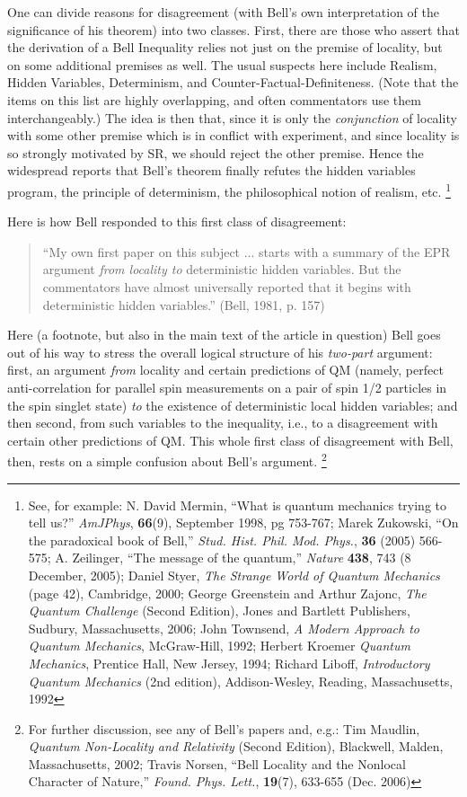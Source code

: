 \documentclass[aps,prc,twocolumn]{revtex4}
\begin{document}
One can divide reasons for disagreement (with Bell's own interpretation
of the significance of his theorem) into two classes.  First, there are
those who assert that the derivation of a Bell Inequality relies not
just on the premise of locality, but on some additional premises
as well.  The usual suspects here include Realism, Hidden Variables,
Determinism, and Counter-Factual-Definiteness.  (Note that the items
on this list are highly overlapping, and often commentators use them
interchangeably.)  The idea is then that, since it is only the
\emph{conjunction} of locality with some other premise which is in conflict
with experiment, and since locality is so strongly motivated by SR, we
should reject the other premise.  Hence the widespread reports that
Bell's theorem finally refutes the hidden variables program, the
principle of determinism, the philosophical notion of realism, etc.
\footnote{See, for example:  N. David Mermin, ``What is quantum
  mechanics trying to tell us?'' \emph{AmJPhys}, {\bf{66}}(9),
  September 1998, pg 753-767; Marek Zukowski, ``On the paradoxical
  book of Bell,'' \emph{Stud. Hist. Phil. Mod. Phys.}, {\bf{36}}
  (2005) 566-575; A. Zeilinger, ``The message of the quantum,''
  \emph{Nature} {\bf{438}}, 743 (8 December, 2005); Daniel Styer,
  \emph{The Strange World of Quantum Mechanics} (page 42), Cambridge,
  2000; George Greenstein and Arthur Zajonc, \emph{The Quantum
    Challenge} (Second Edition), Jones and Bartlett Publishers,
  Sudbury, Massachusetts, 2006; John Townsend, \emph{A Modern Approach
  to Quantum Mechanics}, McGraw-Hill, 1992; Herbert Kroemer
\emph{Quantum Mechanics}, Prentice Hall, New Jersey, 1994; Richard
Liboff, \emph{Introductory Quantum Mechanics} (2nd edition),
Addison-Wesley, Reading, Massachusetts, 1992}

Here is how Bell responded to this first class of disagreement:
\begin{quote}
``My own first paper on this subject ... starts with a
summary of the EPR argument \emph{from locality to} deterministic
hidden variables.  But the commentators have almost universally
reported that it begins with deterministic hidden variables.''
(Bell, 1981, p. 157)
\end{quote}
Here
(a footnote, but also in the main text of the article in question)
Bell goes out of his way to stress the overall logical structure of
his \emph{two-part} argument:  first, an argument \emph{from} locality and
certain predictions of QM (namely, perfect anti-correlation for
parallel spin measurements on a pair of spin 1/2 particles in the spin
singlet state) \emph{to} the existence of deterministic local hidden
variables; and then second, from such variables to the inequality,
i.e., to a disagreement with certain other predictions of QM.  This
whole first class of disagreement with Bell, then, rests on a simple
confusion about Bell's argument. 
\footnote{For further discussion, see any of Bell's papers and, e.g.:
  Tim Maudlin, \emph{Quantum Non-Locality and Relativity} (Second
  Edition), Blackwell, Malden, Massachusetts, 2002;  Travis Norsen,
  ``Bell Locality and the Nonlocal Character of Nature,''
  \emph{Found. Phys. Lett.}, {\bf{19}}(7), 633-655 (Dec. 2006)}
\end{document}
